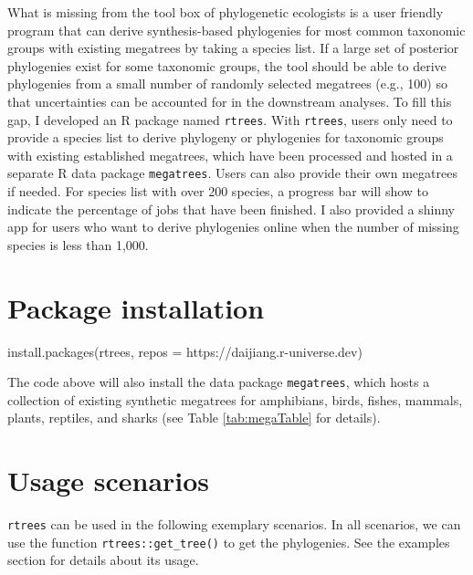 \documentclass[
  12pt,
]{article}
\newenvironment{Shaded}{\begin{snugshade}}{\end{snugshade}}
\newcommand{\AttributeTok}[1]{\textcolor[rgb]{0.77,0.63,0.00}{#1}}
\newcommand{\FunctionTok}[1]{\textcolor[rgb]{0.00,0.00,0.00}{#1}}
\newcommand{\NormalTok}[1]{#1}
\newcommand{\StringTok}[1]{\textcolor[rgb]{0.31,0.60,0.02}{#1}}
\begin{document}
What is missing from the tool box of phylogenetic ecologists is a user friendly program that can derive synthesis-based phylogenies for most common taxonomic groups with existing megatrees by taking a species list. If a large set of posterior phylogenies exist for some taxonomic groups, the tool should be able to derive phylogenies from a small number of randomly selected megatrees (e.g., 100) so that uncertainties can be accounted for in the downstream analyses. To fill this gap, I developed an R package named \texttt{rtrees}. With \texttt{rtrees}, users only need to provide a species list to derive phylogeny or phylogenies for taxonomic groups with existing established megatrees, which have been processed and hosted in a separate R data package \texttt{megatrees}. Users can also provide their own megatrees if needed. For species list with over 200 species, a progress bar will show to indicate the percentage of jobs that have been finished. I also provided a shinny app for users who want to derive phylogenies online when the number of missing species is less than 1,000.

\hypertarget{package-installation}{%
\section{Package installation}\label{package-installation}}

\begin{Shaded}
\begin{Highlighting}[]
\FunctionTok{install.packages}\NormalTok{(}\StringTok{\textquotesingle{}rtrees\textquotesingle{}}\NormalTok{, }\AttributeTok{repos =} \StringTok{\textquotesingle{}https://daijiang.r{-}universe.dev\textquotesingle{}}\NormalTok{)}
\end{Highlighting}
\end{Shaded}

The code above will also install the data package \texttt{megatrees}, which hosts a collection of existing synthetic megatrees for amphibians, birds, fishes, mammals, plants, reptiles, and sharks (see Table \ref{tab:megaTable} for details).

\hypertarget{usage-scenarios}{%
\section{Usage scenarios}\label{usage-scenarios}}

\texttt{rtrees} can be used in the following exemplary scenarios. In all scenarios, we can use the function \texttt{rtrees::get\_tree()} to get the phylogenies. See the examples section for details about its usage.
\end{document}
